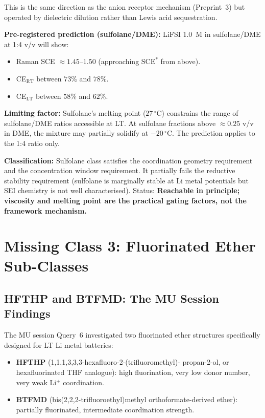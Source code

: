 \documentclass[11pt]{article}
\theoremstyle{plain}
\theoremstyle{definition}
\theoremstyle{remark}
\begin{document}
This is the same direction as the anion receptor mechanism
(Preprint~3) but operated by dielectric dilution rather than
Lewis acid sequestration.

\textbf{Pre-registered prediction (sulfolane/DME):}
LiFSI 1.0~M in sulfolane/DME at 1:4 v/v will show:
\begin{itemize}[leftmargin=2em]
  \item Raman SCE $\approx 1.45$--$1.50$ (approaching
        $\mathrm{SCE}^{*}$ from above).
  \item CE$_\mathrm{RT}$ between $73\%$ and $78\%$.
  \item CE$_\mathrm{LT}$ between $58\%$ and $62\%$.
\end{itemize}

\textbf{Limiting factor:} Sulfolane's melting point ($27\,^\circ$C)
constrains the range of sulfolane/DME ratios accessible at LT.
At sulfolane fractions above $\approx 0.25$ v/v in DME, the
mixture may partially solidify at $-20\,^\circ$C.  The
prediction applies to the 1:4 ratio only.

\textbf{Classification:} Sulfolane class satisfies the
coordination geometry requirement and the concentration window
requirement.  It partially fails the reductive stability
requirement (sulfolane is marginally stable at Li metal
potentials but SEI chemistry is not well characterised).
Status: \textbf{Reachable in principle; viscosity and melting
point are the practical gating factors, not the framework
mechanism.}

\section{Missing Class 3: Fluorinated Ether Sub-Classes}
\label{sec:fluorinated_ether}

\subsection{HFTHP and BTFMD: The MU Session Findings}

The MU session Query~6 investigated two fluorinated ether
structures specifically designed for LT Li metal batteries:

\begin{itemize}[leftmargin=2em]
  \item \textbf{HFTHP} (1,1,1,3,3,3-hexafluoro-2-(trifluoromethyl)-
        propan-2-ol, or hexafluorinated THF analogue): high
        fluorination, very low donor number, very weak Li$^+$
        coordination.
  \item \textbf{BTFMD} (bis(2,2,2-trifluoroethyl)methyl
        orthoformate-derived ether): partially fluorinated,
        intermediate coordination strength.
\end{itemize}
\end{document}
